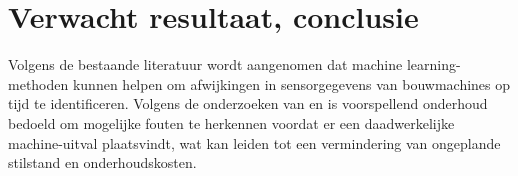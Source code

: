 


\section{Verwacht resultaat, conclusie}%
\label{sec:verwachte_resultaten}

Volgens de bestaande literatuur wordt aangenomen dat machine learning-methoden kunnen helpen om afwijkingen in sensorgegevens van bouwmachines op tijd te identificeren. Volgens de onderzoeken van \textcite{ErRatby2025} en \textcite{Mikulic2024} is voorspellend onderhoud bedoeld om mogelijke fouten te herkennen voordat er een daadwerkelijke machine-uitval plaatsvindt, wat kan leiden tot een vermindering van ongeplande stilstand en onderhoudskosten.

